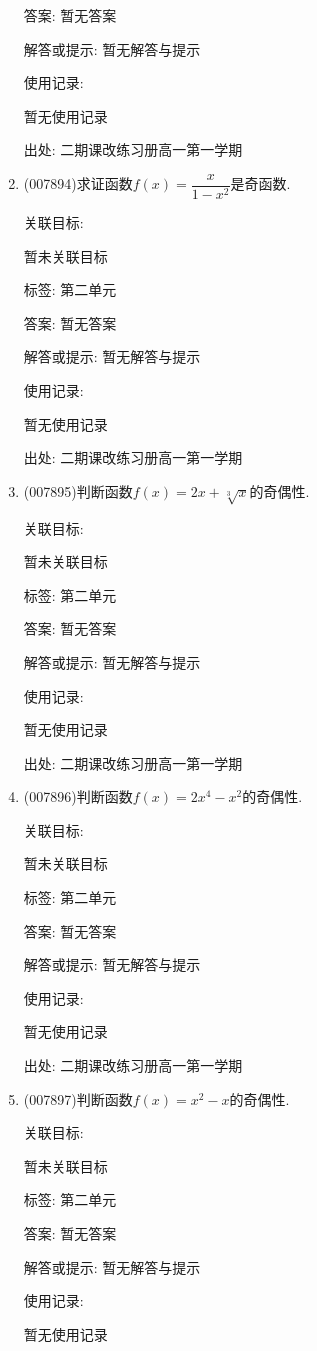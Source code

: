 \documentclass[10pt,a4paper]{article}
\begin{document}
\begin{enumerate}[1.]
答案: 暂无答案

解答或提示: 暂无解答与提示

使用记录:

暂无使用记录


出处: 二期课改练习册高一第一学期
\item { (007894)}求证函数$f(x)=\dfrac x{1-x^2}$是奇函数.


关联目标:

暂未关联目标



标签: 第二单元

答案: 暂无答案

解答或提示: 暂无解答与提示

使用记录:

暂无使用记录


出处: 二期课改练习册高一第一学期
\item { (007895)}判断函数$f(x)=2x+\sqrt[3]x$的奇偶性.


关联目标:

暂未关联目标



标签: 第二单元

答案: 暂无答案

解答或提示: 暂无解答与提示

使用记录:

暂无使用记录


出处: 二期课改练习册高一第一学期
\item { (007896)}判断函数$f(x)=2x^4-x^2$的奇偶性.


关联目标:

暂未关联目标



标签: 第二单元

答案: 暂无答案

解答或提示: 暂无解答与提示

使用记录:

暂无使用记录


出处: 二期课改练习册高一第一学期
\item { (007897)}判断函数$f(x)=x^2-x$的奇偶性.


关联目标:

暂未关联目标



标签: 第二单元

答案: 暂无答案

解答或提示: 暂无解答与提示

使用记录:

暂无使用记录



\end{enumerate}
\end{document}
